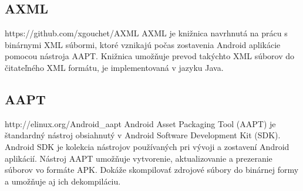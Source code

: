 \subsection{AXML}
\label{AXML}
https://github.com/xgouchet/AXML
AXML je knižnica navrhnutá na prácu s binárnymi XML súbormi, ktoré vznikajú počas zostavenia Android aplikácie pomocou nástroja AAPT. Knižnica umožňuje prevod takýchto XML súborov do čitateľného XML formátu, je implementovaná v jazyku Java.


\subsection{AAPT}
\label{AAPT}
http://elinux.org/Android\_aapt
Android Asset Packaging Tool (AAPT) je štandardný nástroj obsiahnutý v Android Software Development Kit (SDK). Android SDK je kolekcia nástrojov používaných pri vývoji a zostavení Android aplikácií. Nástroj AAPT umožňuje vytvorenie, aktualizovanie a prezeranie súborov vo formáte APK. Dokáže skompilovať zdrojové súbory do binárnej formy a umožňuje aj ich dekompiláciu.


